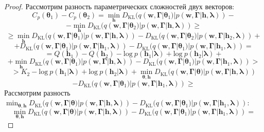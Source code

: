 \begin{proof}
Рассмотрим разность параметрических сложностей двух векторов:
\[
C_p(\boldsymbol{\theta}_1)-C_p(\boldsymbol{\theta}_2) = \min_{\mathbf{h}} D_\text{KL}(q(\mathbf{w}, \boldsymbol{\Gamma}|\boldsymbol{\theta}_1)|p(\mathbf{w}, \boldsymbol{\Gamma}|\mathbf{h}, \boldsymbol{\lambda}))-
\]
\[
-\min_{\mathbf{h}} D_\text{KL}(q(\mathbf{w}, \boldsymbol{\Gamma}|\boldsymbol{\theta}_2)|p(\mathbf{w}, \boldsymbol{\Gamma}|\mathbf{h}, \boldsymbol{\lambda})) \geq
\]
\[
\geq
\min_{\mathbf{h}} D_\text{KL}(q(\mathbf{w}, \boldsymbol{\Gamma}|\boldsymbol{\theta}_1)|p(\mathbf{w}, \boldsymbol{\Gamma}|\mathbf{h}, \boldsymbol{\lambda}))- D_\text{KL}(q(\mathbf{w}, \boldsymbol{\Gamma}|\boldsymbol{\theta}_2)|p(\mathbf{w}, \boldsymbol{\Gamma}|\mathbf{h}_2, \boldsymbol{\lambda})) +
\]
\[
+D_\text{KL}(q(\mathbf{w}, \boldsymbol{\Gamma}|\boldsymbol{\theta}_1)|p(\mathbf{w}, \boldsymbol{\Gamma}|\mathbf{h}_1, \boldsymbol{\lambda})) - D_\text{KL}(q(\mathbf{w}, \boldsymbol{\Gamma}|\boldsymbol{\theta}_1)|p(\mathbf{w}, \boldsymbol{\Gamma}|\mathbf{h}_1, \boldsymbol{\lambda})) =
\]
\[
= Q(\mathbf{h}_1)-Q(\mathbf{h}_2)-\text{log}~p (\mathbf{h}_1|\boldsymbol{\lambda})+\text{log}~p (\mathbf{h}_2|\boldsymbol{\lambda})+
\]
\[+\min_{\mathbf{h}} D_\text{KL}(q(\mathbf{w}, \boldsymbol{\Gamma}|\boldsymbol{\theta}_1)|p(\mathbf{w}, \boldsymbol{\Gamma}|\mathbf{h}, \boldsymbol{\lambda})) -  D_\text{KL}(q(\mathbf{w}, \boldsymbol{\Gamma}|\boldsymbol{\theta}_1)|p(\mathbf{w}, \boldsymbol{\Gamma}|\mathbf{h}_1, \boldsymbol{\lambda})) >
\]
\[
>K_2 -\text{log}~p (\mathbf{h}_1|\boldsymbol{\lambda})+\text{log}~p (\mathbf{h}_2|\boldsymbol{\lambda}) + \min_{\boldsymbol{\theta}, \mathbf{h}} D_\text{KL}(q(\mathbf{w}, \boldsymbol{\Gamma}|\boldsymbol{\theta})|p(\mathbf{w}, \boldsymbol{\Gamma}|\mathbf{h}, \boldsymbol{\lambda})) 
\]
\[
-  D_\text{KL}(q(\mathbf{w}, \boldsymbol{\Gamma}|\boldsymbol{\theta}_1)|p(\mathbf{w}, \boldsymbol{\Gamma}|\mathbf{h}_1, \boldsymbol{\lambda})) \geq
\]
Рассмотрим разность $\min_{\boldsymbol{\theta}, \mathbf{h}} D_\text{KL}(q(\mathbf{w}, \boldsymbol{\Gamma}|\boldsymbol{\theta})|p(\mathbf{w}, \boldsymbol{\Gamma}|\mathbf{h}, \boldsymbol{\lambda}))  - D_\text{KL}(q(\mathbf{w}, \boldsymbol{\Gamma}|\boldsymbol{\theta}_1)|p(\mathbf{w}, \boldsymbol{\Gamma}|\mathbf{h}_1, \boldsymbol{\lambda})):$
\[\min_{\boldsymbol{\theta}, \mathbf{h}} D_\text{KL}(q(\mathbf{w}, \boldsymbol{\Gamma}|\boldsymbol{\theta})|p(\mathbf{w}, \boldsymbol{\Gamma}|\mathbf{h}, \boldsymbol{\lambda}))  - D_\text{KL}(q(\mathbf{w}, \boldsymbol{\Gamma}|\boldsymbol{\theta}_1)|p(\mathbf{w}, \boldsymbol{\Gamma}|\mathbf{h}_1, \boldsymbol{\lambda})) =
\]
\end{proof}
